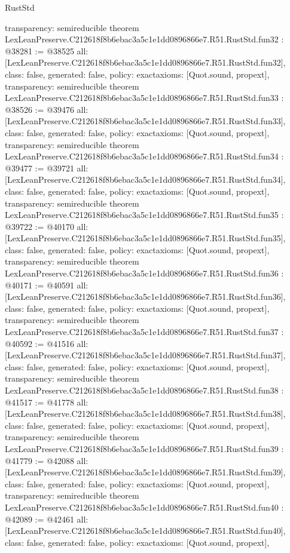 \begin{lexlean}{RustStd}
\begin{coremodule}
{  transparency: semireducible
}
theorem LexLeanPreserve.C212618f8b6ebac3a5c1e1dd0896866e7.R51.RustStd.fun32 : @38281 := @38525 {
  all: [LexLeanPreserve.C212618f8b6ebac3a5c1e1dd0896866e7.R51.RustStd.fun32],
  class: false,
  generated: false,
  policy: exact{axioms: [Quot.sound, propext]},
  transparency: semireducible
}
theorem LexLeanPreserve.C212618f8b6ebac3a5c1e1dd0896866e7.R51.RustStd.fun33 : @38526 := @39476 {
  all: [LexLeanPreserve.C212618f8b6ebac3a5c1e1dd0896866e7.R51.RustStd.fun33],
  class: false,
  generated: false,
  policy: exact{axioms: [Quot.sound, propext]},
  transparency: semireducible
}
theorem LexLeanPreserve.C212618f8b6ebac3a5c1e1dd0896866e7.R51.RustStd.fun34 : @39477 := @39721 {
  all: [LexLeanPreserve.C212618f8b6ebac3a5c1e1dd0896866e7.R51.RustStd.fun34],
  class: false,
  generated: false,
  policy: exact{axioms: [Quot.sound, propext]},
  transparency: semireducible
}
theorem LexLeanPreserve.C212618f8b6ebac3a5c1e1dd0896866e7.R51.RustStd.fun35 : @39722 := @40170 {
  all: [LexLeanPreserve.C212618f8b6ebac3a5c1e1dd0896866e7.R51.RustStd.fun35],
  class: false,
  generated: false,
  policy: exact{axioms: [Quot.sound, propext]},
  transparency: semireducible
}
theorem LexLeanPreserve.C212618f8b6ebac3a5c1e1dd0896866e7.R51.RustStd.fun36 : @40171 := @40591 {
  all: [LexLeanPreserve.C212618f8b6ebac3a5c1e1dd0896866e7.R51.RustStd.fun36],
  class: false,
  generated: false,
  policy: exact{axioms: [Quot.sound, propext]},
  transparency: semireducible
}
theorem LexLeanPreserve.C212618f8b6ebac3a5c1e1dd0896866e7.R51.RustStd.fun37 : @40592 := @41516 {
  all: [LexLeanPreserve.C212618f8b6ebac3a5c1e1dd0896866e7.R51.RustStd.fun37],
  class: false,
  generated: false,
  policy: exact{axioms: [Quot.sound, propext]},
  transparency: semireducible
}
theorem LexLeanPreserve.C212618f8b6ebac3a5c1e1dd0896866e7.R51.RustStd.fun38 : @41517 := @41778 {
  all: [LexLeanPreserve.C212618f8b6ebac3a5c1e1dd0896866e7.R51.RustStd.fun38],
  class: false,
  generated: false,
  policy: exact{axioms: [Quot.sound, propext]},
  transparency: semireducible
}
theorem LexLeanPreserve.C212618f8b6ebac3a5c1e1dd0896866e7.R51.RustStd.fun39 : @41779 := @42088 {
  all: [LexLeanPreserve.C212618f8b6ebac3a5c1e1dd0896866e7.R51.RustStd.fun39],
  class: false,
  generated: false,
  policy: exact{axioms: [Quot.sound, propext]},
  transparency: semireducible
}
theorem LexLeanPreserve.C212618f8b6ebac3a5c1e1dd0896866e7.R51.RustStd.fun40 : @42089 := @42461 {
  all: [LexLeanPreserve.C212618f8b6ebac3a5c1e1dd0896866e7.R51.RustStd.fun40],
  class: false,
  generated: false,
  policy: exact{axioms: [Quot.sound, propext]},
}
\end{coremodule}
\end{lexlean}

